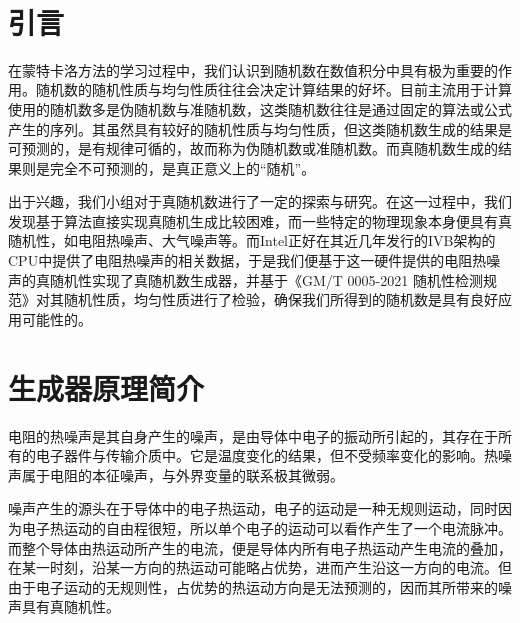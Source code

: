 \documentclass[12pt,a4paper]{article}%
\begin{document}
    \begin{adjustwidth}{1.06cm}{1.06cm}
        \fontsize{10.5pt}{15.75pt}\\
    \end{adjustwidth}

    \newpage%


    \section{引言}
    在蒙特卡洛方法的学习过程中，我们认识到随机数在数值积分中具有极为重要的作用。随机数的随机性质与均匀性质往往会决定计算结果的好坏。目前主流用于计算使用的随机数多是伪随机数与准随机数，这类随机数往往是通过固定的算法或公式产生的序列。其虽然具有较好的随机性质与均匀性质，但这类随机数生成的结果是可预测的，是有规律可循的，故而称为伪随机数或准随机数。而真随机数生成的结果则是完全不可预测的，是真正意义上的“随机”。

    出于兴趣，我们小组对于真随机数进行了一定的探索与研究。在这一过程中，我们发现基于算法直接实现真随机生成比较困难，而一些特定的物理现象本身便具有真随机性，如电阻热噪声、大气噪声等。而Intel正好在其近几年发行的IVB架构的CPU中提供了电阻热噪声的相关数据，于是我们便基于这一硬件提供的电阻热噪声的真随机性实现了真随机数生成器，并基于《GM/T 0005-2021 随机性检测规范》对其随机性质，均匀性质进行了检验，确保我们所得到的随机数是具有良好应用可能性的。


    \section{生成器原理简介}
    电阻的热噪声是其自身产生的噪声，是由导体中电子的振动所引起的，其存在于所有的电子器件与传输介质中。它是温度变化的结果，但不受频率变化的影响。热噪声属于电阻的本征噪声，与外界变量的联系极其微弱。

    噪声产生的源头在于导体中的电子热运动，电子的运动是一种无规则运动，同时因为电子热运动的自由程很短，所以单个电子的运动可以看作产生了一个电流脉冲。而整个导体由热运动所产生的电流，便是导体内所有电子热运动产生电流的叠加，在某一时刻，沿某一方向的热运动可能略占优势，进而产生沿这一方向的电流。但由于电子运动的无规则性，占优势的热运动方向是无法预测的，因而其所带来的噪声具有真随机性。
\end{document}
